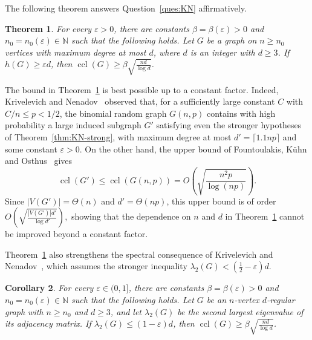 \documentclass[11pt,a4paper]{article}
\newtheorem{theorem}{Theorem}[section]
\newtheorem{corollary}[theorem]{Corollary}
\theoremstyle{definition}
\theoremstyle{remark}
\DeclareMathOperator{\ccl}{ccl}
\newcommand{\N}{\mathbb N}
\newcommand{\eps}{\varepsilon}
\begin{document}
The following theorem answers Question~\ref{ques:KN} affirmatively.

\begin{theorem}\label{thm:main}
For every $\eps>0$, there are constants $\beta=\beta(\eps)>0$ and $n_0=n_0(\eps)\in\N$ such that the following holds. 
 Let $G$ be a graph on $n\ge n_0$ vertices with maximum degree
at most $d$, where $d$ is an integer with $d\ge 3$. If $h(G)\ge\eps d$, then $\ccl(G)\ge \beta\sqrt{\frac{nd}{\log d}}$.
\end{theorem}

The bound in Theorem~\ref{thm:main} is best possible up to a constant
factor. Indeed, Krivelevich and Nenadov~\cite{KN}
observed that, for a sufficiently large constant \(C\) with 
\(C/n\le p<1/2\), the binomial random graph \(G(n,p)\) contains with
high probability a large induced subgraph \(G'\) satisfying even the
stronger hypotheses of Theorem~\ref{thm:KN-strong}, with maximum degree at most 
\(d'=\lceil 1.1np\rceil\) and some constant \(\eps>0\). On the other
hand, the upper bound of Fountoulakis, K\"uhn and
Osthus~\cite{FKO08} gives
\[
 \ccl(G')
 \le \ccl(G(n,p))
 =O\!\left(\sqrt{\frac{n^2p}{\log(np)}}\right).
\]
Since \(|V(G')|=\Theta(n)\) and \(d'=\Theta(np)\), this upper bound is
of order
$
 O\!\left(
   \sqrt{\frac{|V(G')|d'}{\log d'}}
 \right),
$
showing that the dependence on \(n\) and \(d\) in
Theorem~\ref{thm:main} cannot be improved beyond a constant factor.

Theorem~\ref{thm:main} also strengthens the spectral consequence of Krivelevich and Nenadov~\cite[Corollary~1.3]{KN}, which assumes the stronger inequality $\lambda_2(G)<(\frac12-\eps)d$.

\begin{corollary}\label{cor:spectral}
For every $\eps\in(0,1]$, there are constants $\beta=\beta(\eps)>0$ and $n_0=n_0(\eps)\in\N$ such that the following holds. Let $G$ be an $n$-vertex $d$-regular graph with $n\ge n_0$ and $d\ge3$, and let $\lambda_2(G)$ be the second largest eigenvalue of its adjacency matrix. If
$\lambda_2(G)\le(1-\eps)d$, then
$\ccl(G)\ge\beta\sqrt{\frac{nd}{\log d}}$.
\end{corollary}
\end{document}
